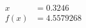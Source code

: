 \documentclass[preview]{standalone}
\begin{document}
\begin{align*}
x &= 0.3246\\f(x) &= 4.5579268
\end{align*}
\end{document}
